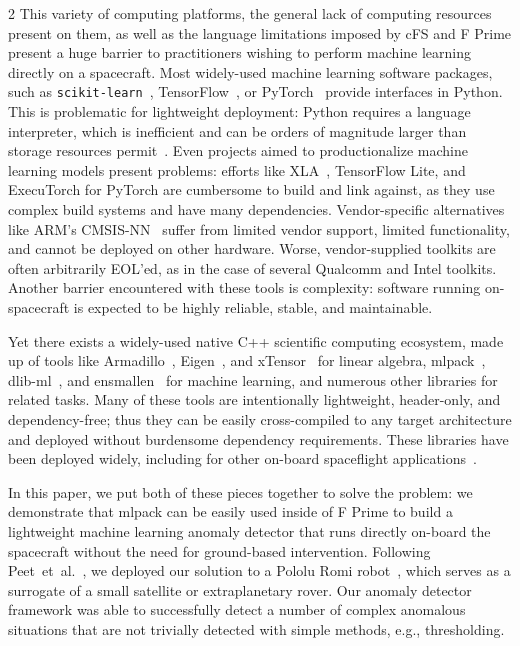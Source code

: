 \documentclass[10pt, fleqn]{article}
\begin{document}
\begin{multicols*}{2}
This variety of computing platforms,
the general lack of computing resources present on them,
as well as the language limitations imposed by cFS and F Prime
present a huge barrier to
practitioners wishing to perform machine learning directly on a spacecraft.
Most widely-used machine learning software packages,
such as {\small \tt scikit-learn}~\cite{pedregosa2011scikit},
TensorFlow~\cite{abadi2016tensorflow},
or PyTorch~\cite{paszke2019pytorch}
provide interfaces in Python.
This is problematic for lightweight deployment:
Python requires a language interpreter,
which is inefficient and can be orders of magnitude larger than
storage resources permit~\cite{mlpack_pydata}.
Even projects aimed to productionalize machine learning models present problems:
efforts like XLA~\cite{sabne2020xla},
TensorFlow Lite,
and ExecuTorch for PyTorch
are cumbersome to build and link against,
as they use complex build systems and have many dependencies.
Vendor-specific alternatives like ARM's CMSIS-NN~\cite{ARM_CMSIS_NN}
suffer from limited vendor support,
limited functionality,
and cannot be deployed on other hardware.
Worse, vendor-supplied toolkits are often arbitrarily EOL'ed,
as in the case of several Qualcomm and Intel toolkits.
Another barrier encountered with these tools is complexity:
software running on-spacecraft is expected to be
highly reliable, stable, and maintainable.

Yet there exists a widely-used
native C++ scientific computing ecosystem,
made up of tools like
Armadillo~\cite{sanderson2016armadillo}, Eigen~\cite{guennebaud2010eigen}, and xTensor~\cite{xtensor} for linear algebra,
mlpack~\cite{mlpack2023}, dlib-ml~\cite{king2009dlib}, and ensmallen~\cite{curtin2021ensmallen} for machine learning,
and numerous other libraries for related tasks.
Many of these tools are intentionally lightweight, header-only, and dependency-free;
thus they can be easily cross-compiled to any target architecture
and deployed without burdensome dependency requirements.
These libraries have been deployed widely,
including for other on-board spaceflight applications~\cite{hackett2017implementation,hackett2018implementation}.

In this paper,
we put both of these pieces together to solve the problem:
we demonstrate that mlpack can be easily used inside of F Prime
to build a lightweight machine learning anomaly detector
that runs directly on-board the spacecraft
without the need for ground-based intervention.
Following Peet~et~al.~\cite{peet2024framework},
we deployed our solution to a Pololu Romi robot~\cite{PololuRomi},
which serves as a surrogate of a small satellite or extraplanetary rover.
Our anomaly detector framework was able to successfully detect
a number of complex anomalous situations
that are not trivially detected with simple methods,
e.g., thresholding.


\end{multicols*}
\end{document}
